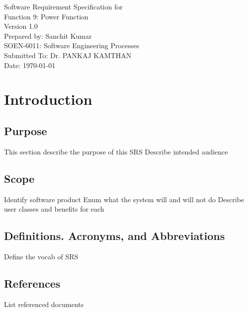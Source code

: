 \documentclass[a4paper,12pt]{scrreprt}
\newcommand{\Author}{Sanchit Kumar}
\newcommand{\ProjectName}{Function 9: Power Function}
\newcommand{\Title}{Software Requirement Specification}
\newcommand{\Course}{SOEN-6011: Software Engineering Processes}
\newcommand{\ProfessorName}{Dr. PANKAJ KAMTHAN}
\begin{document}
\begin{flushright} %
	
	\begin{bfseries}
		\Huge \Title \vspace{15mm}
		for \\ \vspace{15mm}
		\ProjectName \vspace{15mm}
		\Large \\ Version 1.0 \vspace{15mm} \\
		\vspace{10cm}
		Prepared by: \Author \\ 
		\Course \\ Submitted To: \ProfessorName  \\ Date: \today 

		
	\end{bfseries}	
\end{flushright}
	
\tableofcontents



\chapter{Introduction}	

\section{Purpose}
This section describe the purpose of this SRS
Describe intended audience

\section{Scope}
Identify software product
Enum what the system will and will not do
Describe user classes and benefits for each

\section{Definitions. Acronyms, and Abbreviations}
Define the vocab of SRS

\section{References}
List referenced documents
\end{document}

